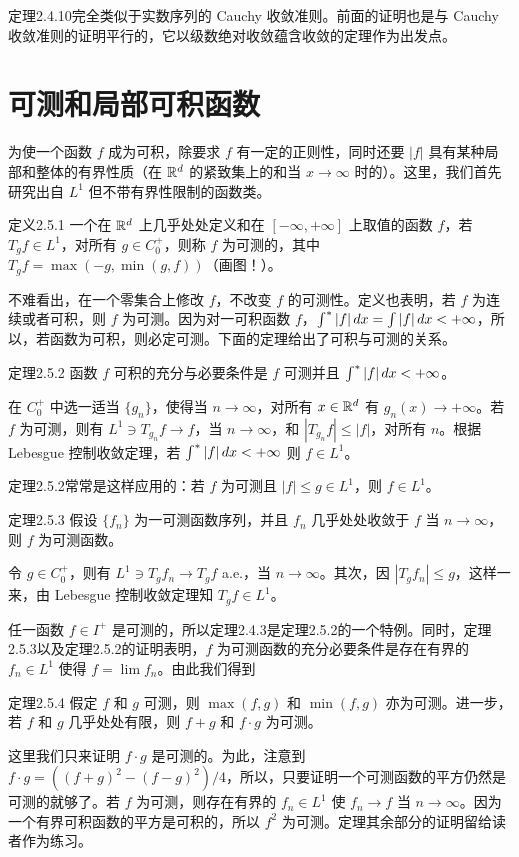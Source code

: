 定理2.4.10完全类似于实数序列的 Cauchy 收敛准则。前面的证明也是与 Cauchy 收敛准则的证明平行的，它以级数绝对收敛蕴含收敛的定理作为出发点。
\section{可测和局部可积函数}
为使一个函数 $f$ 成为可积，除要求 $f$ 有一定的正则性，同时还要 $|f|$ 具有某种局部和整体的有界性质（在 $\mathbb R^d$ 的紧致集上的和当 $x\to\infty$ 时的）。这里，我们首先研究出自 $L^1$ 但不带有界性限制的函数类。
\begin{statement}{定义}{2.5.1}
一个在 $\mathbb R^d$ 上几乎处处定义和在 $[-\infty,+\infty]$ 上取值的函数 $f$，若 $T_gf\in L^1$，对所有 $g\in C_0^+$，则称 $f$ 为可测的，其中 $T_gf=\max(-g,\min(g,f))$（画图！）。
\end{statement}
不难看出，在一个零集合上修改 $f$，不改变 $f$ 的可测性。定义也表明，若 $f$ 为连续或者可积，则 $f$ 为可测。因为对一可积函数 $f$，$\int^{*}|f|\,dx=\int|f|\,dx<+\infty$，所以，若函数为可积，则必定可测。下面的定理给出了可积与可测的关系。
\begin{statement}{定理}{2.5.2}
函数 $f$ 可积的充分与必要条件是 $f$ 可测并且 $\int^{*}|f|\,dx<+\infty$。
\end{statement}
\Proof 在 $C_0^+$ 中选一适当 $\{g_n\}$，使得当 $n\to\infty$，对所有 $x\in\mathbb R^d$ 有 $g_n(x)\to+\infty$。若 $f$ 为可测，则有 $L^1\ni T_{g_n}f\to f$，当 $n\to\infty$，和 $|T_{g_n}f|\le|f|$，对所有 $n$。根据 Lebesgue 控制收敛定理，若 $\int^{*}|f|\,dx<+\infty$ 则 $f\in L^1$。

定理2.5.2常常是这样应用的：若 $f$ 为可测且 $|f|\le g\in L^1$，则 $f\in L^1$。
\begin{statement}{定理}{2.5.3}
假设 $\{f_n\}$ 为一可测函数序列，并且 $f_n$ 几乎处处收敛于 $f$ 当 $n\to\infty$，则 $f$ 为可测函数。
\end{statement}
\Proof 令 $g\in C_0^+$，则有 $L^1\ni T_gf_n\to T_gf$ a.e.，当 $n\to\infty$。其次，因 $|T_gf_n|\le g$，这样一来，由 Lebesgue 控制收敛定理知 $T_gf\in L^1$。

任一函数 $f\in I^+$ 是可测的，所以定理2.4.3是定理2.5.2的一个特例。同时，定理2.5.3以及定理2.5.2的证明表明，$f$ 为可测函数的充分必要条件是存在有界的 $f_n\in L^1$ 使得 $f=\lim f_n$。由此我们得到
\begin{statement}{定理}{2.5.4}
假定 $f$ 和 $g$ 可测，则 $\max(f,g)$ 和 $\min(f,g)$ 亦为可测。进一步，若 $f$ 和 $g$ 几乎处处有限，则 $f+g$ 和 $f\cdot g$ 为可测。
\end{statement}
\Proof 这里我们只来证明 $f\cdot g$ 是可测的。为此，注意到 $f\cdot g=((f+g)^2-(f-g)^2)/4$，所以，只要证明一个可测函数的平方仍然是可测的就够了。若 $f$ 为可测，则存在有界的 $f_n\in L^1$ 使 $f_n\to f$ 当 $n\to\infty$。因为一个有界可积函数的平方是可积的，所以 $f^2$ 为可测。定理其余部分的证明留给读者作为练习。

